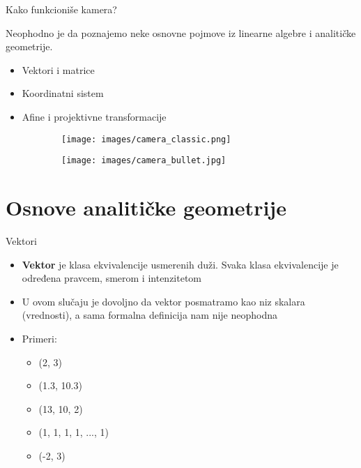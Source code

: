 \documentclass[bookmarks=true,bookmarksopen=true,pdfborder={0 0 0},pdfhighlight={/N},linkbordercolor={.5 .5 .5},implicit=false,unicode,xcolor={table}]{beamer}
\begin{document}
\begin{frame}{Kako funkcioniše kamera? }
  
  Neophodno je da poznajemo neke osnovne pojmove iz linearne algebre i analitičke geometrije.
  \begin{itemize}
    \item Vektori i matrice
    \item Koordinatni sistem
    \item Afine i projektivne transformacije
  \end{itemize}

  \begin{figure}
    \begin{subfigure}{3cm}
      \texttt{[image: images/camera\_classic.png]}
    \end{subfigure}
    \begin{subfigure}{3cm}
      \texttt{[image: images/camera\_bullet.jpg]}
    \end{subfigure}
  \end{figure}

\end{frame}

\section{Osnove analitičke geometrije}
\begin{frame}{Vektori}
  
  \begin{itemize}
    \item \textbf{Vektor} je klasa ekvivalencije usmerenih duži. Svaka klasa ekvivalencije je određena pravcem, smerom i intenzitetom
    \item U ovom slučaju je dovoljno da vektor posmatramo kao niz skalara (vrednosti), a sama formalna definicija nam nije neophodna
    \item Primeri:
      \begin{itemize}
        \item (2, 3)
        \item (1.3, 10.3)
        \item (13, 10, 2)
        \item (1, 1, 1, 1, ..., 1)
        \item (-2, 3)
      \end{itemize}
  \end{itemize}

\end{frame}
\end{document}

